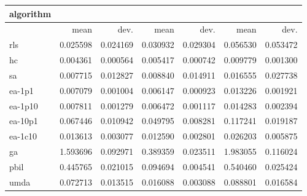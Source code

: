 \begin{tabular}{@{}l*{6}{>{{}}N{1}{2}}@{}}
\toprule
{algorithm} &  &  &  \\
\midrule
& {mean} & {dev.} & {mean} & {dev.} & {mean} & {dev.} \\
\midrule
rls & 0.025598 & 0.024169 & 0.030932 & 0.029304 & 0.056530 & 0.053472 \\
 hc & 0.004361 & 0.000564 & 0.005417 & 0.000742 & 0.009779 & 0.001300 \\
 sa & 0.007715 & 0.012827 & 0.008840 & 0.014911 & 0.016555 & 0.027738 \\
 ea-1p1 & 0.007079 & 0.001004 & 0.006147 & 0.000923 & 0.013226 & 0.001921 \\
 ea-1p10 & 0.007811 & 0.001279 & 0.006472 & 0.001117 & 0.014283 & 0.002394 \\
 ea-10p1 & 0.067446 & 0.010942 & 0.049795 & 0.008281 & 0.117241 & 0.019187 \\
 ea-1c10 & 0.013613 & 0.003077 & 0.012590 & 0.002801 & 0.026203 & 0.005875 \\
 ga & 1.593696 & 0.092971 & 0.389359 & 0.023511 & 1.983055 & 0.116024 \\
 pbil & 0.445765 & 0.021015 & 0.094694 & 0.004541 & 0.540460 & 0.025424 \\
 umda & 0.072713 & 0.013515 & 0.016088 & 0.003088 & 0.088801 & 0.016584 \\
 \bottomrule
\end{tabular}

